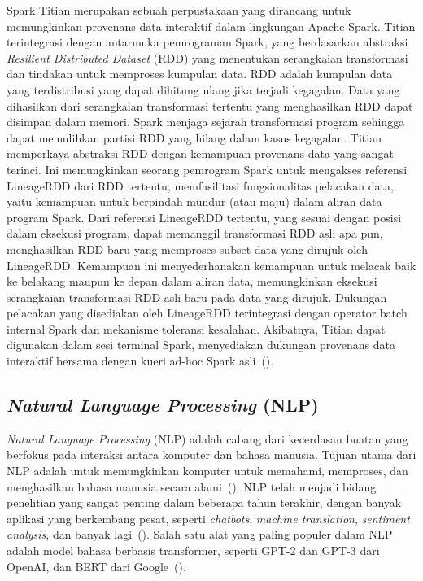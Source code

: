 Spark Titian merupakan sebuah perpustakaan yang dirancang untuk
memungkinkan provenans data interaktif dalam lingkungan Apache Spark.
Titian terintegrasi dengan antarmuka pemrograman Spark, yang
berdasarkan abstraksi \emph{Resilient Distributed Dataset} (RDD)
yang menentukan serangkaian transformasi dan tindakan untuk
memproses kumpulan data. RDD adalah kumpulan data yang terdistribusi
yang dapat dihitung ulang jika terjadi kegagalan.
Data yang dihasilkan dari serangkaian
transformasi tertentu yang menghasilkan RDD dapat disimpan dalam
memori. Spark menjaga sejarah transformasi program sehingga dapat
memulihkan partisi RDD yang hilang dalam
kasus kegagalan. Titian memperkaya abstraksi RDD
dengan kemampuan provenans data yang sangat terinci. Ini
memungkinkan seorang pemrogram Spark untuk mengakses referensi
LineageRDD dari RDD tertentu, memfasilitasi fungsionalitas
pelacakan data, yaitu kemampuan untuk berpindah mundur
(atau maju) dalam aliran data program Spark. Dari referensi
LineageRDD tertentu, yang sesuai dengan posisi dalam eksekusi
program, dapat memanggil transformasi RDD asli apa pun,
menghasilkan RDD baru yang memproses subset data yang
dirujuk oleh LineageRDD. Kemampuan ini menyederhanakan
kemampuan untuk melacak baik ke belakang maupun ke depan
dalam aliran data, memungkinkan eksekusi serangkaian transformasi
RDD asli baru pada data yang dirujuk. Dukungan pelacakan yang
disediakan oleh LineageRDD terintegrasi dengan operator batch
internal Spark dan mekanisme toleransi kesalahan. Akibatnya,
Titian dapat digunakan dalam sesi terminal Spark, menyediakan
dukungan provenans data interaktif bersama dengan kueri ad-hoc
Spark asli~(\cite{interlandi2015}).

\subsection{\emph{Natural Language Processing} (NLP)}

\emph{Natural Language Processing} (NLP) adalah cabang dari kecerdasan buatan yang berfokus pada interaksi antara komputer dan bahasa manusia. Tujuan utama dari NLP adalah untuk memungkinkan komputer untuk memahami, memproses, dan menghasilkan bahasa manusia secara alami~(\cite{jurafsky2021}). NLP telah menjadi bidang penelitian yang sangat penting dalam beberapa tahun terakhir, dengan banyak aplikasi yang berkembang pesat, seperti \emph{chatbots}, \emph{machine translation}, \emph{sentiment analysis}, dan banyak lagi~(\cite{manning2014}). Salah satu alat yang paling populer dalam NLP adalah model bahasa berbasis transformer, seperti GPT-2 dan GPT-3 dari OpenAI, dan BERT dari Google~(\cite{devlin2019}).

